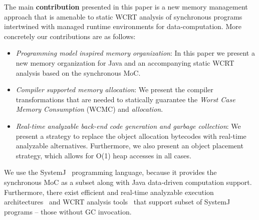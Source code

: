
The main \textbf{contribution} presented in this paper is a new memory
management approach that is amenable to static WCRT analysis of
synchronous programs intertwined with managed runtime environments for
data-computation. More concretely our contributions are as follows:

\begin{itemize}
\item \textit{Programming model inspired memory organization}: In this
  paper we present a new memory organization for Java and an
  accompanying static WCRT analysis based on the synchronous MoC.
\item \textit{Compiler supported memory allocation}: We present the
  compiler transformations that are needed to statically guarantee the
  \textit{Worst Case Memory Consumption} (WCMC) and \textit{allocation}.
\item \textit{Real-time analyzable back-end code generation and garbage
    collection}: We present a strategy to replace the object allocation
  bytecodes with real-time analyzable alternatives. Furthermore, we also
  present an object placement strategy, which allows for O(1) heap
  accesses in all cases.
\end{itemize}

We use the SystemJ~\cite{amal10} programming language, because it
provides the synchronous MoC as a subset along with Java data-driven
computation support. Furthermore, there exist efficient and real-time
analyzable execution architectures~\cite{nadeem2011rjop} and WCRT
analysis tools~\cite{LiMS14} that support subset of SystemJ programs --
those without GC invocation.



